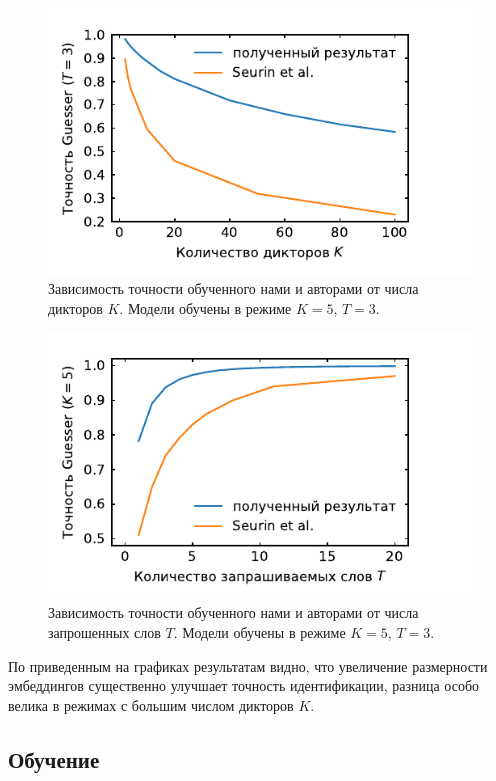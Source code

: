 \begin{figure}[!h]
    \centering
    \includegraphics[scale=1.0]{../plots/guest_sweep.pdf}
    \caption{Зависимость точности \guesser{} обученного нами и авторами
    \citeisr{} от числа дикторов $K$. Модели обучены в режиме $K = 5$, $T = 3$.}
\end{figure}

\begin{figure}[!h]
    \centering
    \includegraphics[scale=1.0]{../plots/word_sweep.pdf}
    \caption{Зависимость точности \guesser{} обученного нами и авторами
    \citeisr{} от числа запрошенных слов $T$. Модели обучены в режиме $K = 5$,
    $T = 3$.}
\end{figure}

По приведенным на графиках результатам видно, что увеличение размерности
эмбеддингов существенно улучшает точность идентификации, разница особо
велика в режимах с большим числом дикторов $K$.

\subsection{Обучение \enquirer{}}

